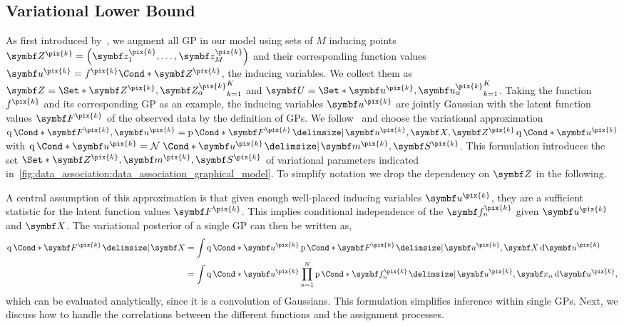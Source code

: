 \subsection{Variational Lower Bound}
\label{sub:data_association:lower_bound}
As first introduced by~\textcite{titsias_variational_2009}, we augment all GP in our model using sets of $M$ inducing points $\mat{Z^{\pix{k}}} = \left(\mat{z_1^{\pix{k}}}, \ldots, \mat{z_M^{\pix{k}}}\right)$ and their corresponding function values $\mat{u^{\pix{k}}} = \Fun*{f^{\pix{k}}}{\mat{Z^{\pix{k}}}}$, the inducing variables.
We collect them as $\mat{Z} = \Set*{\mat{Z^{\pix{k}}}, \mat{Z_\alpha^{\pix{k}}}}_{k=1}^K$ and $\mat{U} = \Set*{\mat{u^{\pix{k}}}, \mat{u_\alpha^{\pix{k}}}}_{k=1}^K$.
Taking the function $f^{\pix{k}}$ and its corresponding GP as an example, the inducing variables $\mat{u^{\pix{k}}}$ are jointly Gaussian with the latent function values $\mat{F^{\pix{k}}}$ of the observed data by the definition of GPs.
We follow~\parencite{hensman_gaussian_2013} and choose the variational approximation $\Variat*{\mat{F^{\pix{k}}}, \mat{u^{\pix{k}}}} = \Prob*{\mat{F^{\pix{k}}} \given \mat{u^{\pix{k}}}, \mat{X}, \mat{Z^{\pix{k}}}}\Variat*{\mat{u^{\pix{k}}}}$ with $\Variat*{\mat{u^{\pix{k}}}} = \Gaussian*{\mat{u^{\pix{k}}} \given \mat{m^{\pix{k}}}, \mat{S^{\pix{k}}}}$.
This formulation introduces the set $\Set*{\mat{Z^{\pix{k}}}, \mat{m^{\pix{k}}}, \mat{S^{\pix{k}}}}$ of variational parameters indicated in~\cref{fig:data_association:data_association_graphical_model}.
To simplify notation we drop the dependency on $\mat{Z}$ in the following.

A central assumption of this approximation is that given enough well-placed inducing variables $\mat{u^{\pix{k}}}$, they are a sufficient statistic for the latent function values $\mat{F^{\pix{k}}}$.
This implies conditional independence of the $\mat{f_n^{\pix{k}}}$ given $\mat{u^{\pix{k}}}$ and $\mat{X}$.
The variational posterior of a single GP can then be written as,
\begin{align}
\begin{split}
    \Variat*{\mat{F^{\pix{k}}} \given \mat{X}}
    &=
    \int \Variat*{\mat{u^{\pix{k}}}}
    \Prob*{\mat{F^{\pix{k}}} \given \mat{u^{\pix{k}}}, \mat{X}}
    \diff \mat{u^{\pix{k}}}
    \\
    &=
    \int \Variat*{\mat{u^{\pix{k}}}}
    \prod_{n=1}^N \Prob*{\mat{f_n^{\pix{k}}} \given \mat{u^{\pix{k}}}, \mat{x_n}}
    \diff \mat{u^{\pix{k}}},
\end{split}
\end{align}
which can be evaluated analytically, since it is a convolution of Gaussians.
This formulation simplifies inference within single GPs.
Next, we discuss how to handle the correlations between the different functions and the assignment processes.

